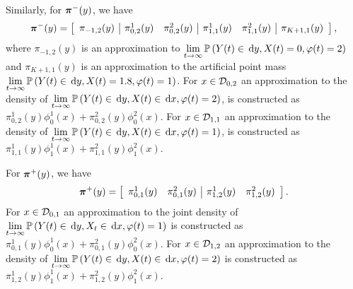 Similarly, for \( {\boldsymbol\pi}^-(y)\), we have 
\[ {\boldsymbol \pi}^-(y) = \left[\begin{array}{c|cc|cc|c} {\pi}_{-1,2}(y) &  {\pi}_{0,2}^1(y) &  {\pi}_{0,2}^2(y) &  {\pi}_{1,1}^1(y) &  {\pi}_{1,1}^2(y) &  {\pi}_{K+1,1}(y) \end{array}\right],\]
where \( {\pi}_{-1,2}(y)\) is an approximation to \( \lim\limits_{t\to\infty}\mathbb{P}\left(  Y(t)\in\, \mathrm{d} y, X(t) =0, \varphi({t}) = 2\right)\) and \( {\pi}_{K+1,1}(y)\) is an approximation to the artificial point mass \( \lim\limits_{t\to\infty}\mathbb{P}\left( Y(t)\in \, \mathrm{d} y, X(t) =1.8, \varphi({t}) = 1\right)\). For \(x\in\mathcal{D}_{0,2}\) an approximation to the density of \( \lim\limits_{t\to\infty}\mathbb{P}\left(Y(t) \in \, \mathrm{d} y, X(t) \in \, \mathrm{d} x, \varphi({t}) = 2\right)\), is constructed as \( {\pi}_{0,2}^1(y)\phi_0^1(x) +  {\pi}_{0,2}^2(y)\phi_0^2(x)\). For \(x\in\mathcal{D}_{1,1}\) an approximation to the density of \( \lim\limits_{t\to\infty}\mathbb{P}\left( Y(t) \in \, \mathrm{d} y, X(t) \in \, \mathrm{d} x, \varphi({t}) = 1\right)\), is constructed as \( {\pi}_{1,1}^1(y)\phi_1^1(x) +  {\pi}_{1,1}^2(y)\phi_1^2(x).\)

For \( {\boldsymbol\pi}^+(y)\), we have 
\[ {\boldsymbol \pi}^+(y) = \left[\begin{array}{cc|cc}  {\pi}_{0,1}^1(y) &  {\pi}_{0,1}^2(y) &  {\pi}_{1,2}^1(y) &  {\pi}_{1,2}^2(y) \end{array}\right].\]
For \(x\in\mathcal{D}_{0,1}\) an approximation to the joint density of \( \lim\limits_{t\to\infty}\mathbb{P}\left(Y(t) \in \, \mathrm{d} y, X_t \in \, \mathrm{d} x, \varphi({t}) = 1\right)\) is constructed as \( {\pi}_{0,1}^1(y)\phi_0^1(x) +  {\pi}_{0,1}^2(y)\phi_0^2(x)\). For \(x\in\mathcal{D}_{1,2}\) an approximation to the density of \( \lim\limits_{t\to\infty}\mathbb{P}\left(Y(t) \in \, \mathrm{d} y,  X(t) \in \, \mathrm{d} x, \varphi({t}) = 2\right)\) is constructed as \( {\pi}_{1,2}^1(y)\phi_1^1(x) +  {\pi}_{1,2}^2(y)\phi_1^2(x).\)

